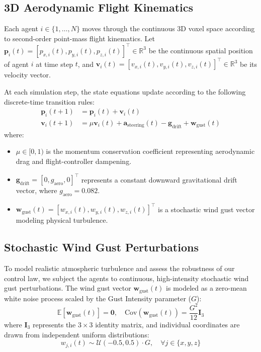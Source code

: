 \documentclass[letterpaper, 10pt, conference]{IEEEtran}
\begin{document}
\subsection{3D Aerodynamic Flight Kinematics}
Each agent $i \in \{1, \dots, N\}$ moves through the continuous 3D voxel space according to second-order point-mass flight kinematics. Let $\mathbf{p}_i(t) = [p_{x,i}(t), p_{y,i}(t), p_{z,i}(t)]^\top \in \mathbb{R}^3$ be the continuous spatial position of agent $i$ at time step $t$, and $\mathbf{v}_i(t) = [v_{x,i}(t), v_{y,i}(t), v_{z,i}(t)]^\top \in \mathbb{R}^3$ be its velocity vector.

At each simulation step, the state equations update according to the following discrete-time transition rules:
\begin{align}
    \mathbf{p}_i(t+1) &= \mathbf{p}_i(t) + \mathbf{v}_i(t) \label{eq:pos_update} \\
    \mathbf{v}_i(t+1) &= \mu \mathbf{v}_i(t) + \mathbf{a}_{\text{steering}}(t) - \mathbf{g}_{\text{drift}} + \mathbf{w}_{\text{gust}}(t) \label{eq:vel_update}
\end{align}
where:
\begin{itemize}
    \item $\mu \in [0, 1)$ is the momentum conservation coefficient representing aerodynamic drag and flight-controller dampening.
    \item $\mathbf{g}_{\text{drift}} = [0, g_{\text{aero}}, 0]^\top$ represents a constant downward gravitational drift vector, where $g_{\text{aero}} = 0.082$.
    \item $\mathbf{w}_{\text{gust}}(t) = [w_{x,i}(t), w_{y,i}(t), w_{z,i}(t)]^\top$ is a stochastic wind gust vector modeling physical turbulence.
\end{itemize}

\subsection{Stochastic Wind Gust Perturbations}
To model realistic atmospheric turbulence and assess the robustness of our control law, we subject the agents to continuous, high-intensity stochastic wind gust perturbations. The wind gust vector $\mathbf{w}_{\text{gust}}(t)$ is modeled as a zero-mean white noise process scaled by the Gust Intensity parameter ($G$):
\begin{equation}
    \mathbb{E}[\mathbf{w}_{\text{gust}}(t)] = \mathbf{0}, \quad \text{Cov}(\mathbf{w}_{\text{gust}}(t)) = \frac{G^2}{12} \mathbf{I}_3
    \label{eq:stochastic_wind}
\end{equation}
where $\mathbf{I}_3$ represents the $3 \times 3$ identity matrix, and individual coordinates are drawn from independent uniform distributions:
\begin{equation}
    w_{j,i}(t) \sim \mathcal{U}(-0.5, 0.5) \cdot G, \quad \forall j \in \{x, y, z\}
    \label{eq:gust_noise}
\end{equation}
\end{document}
